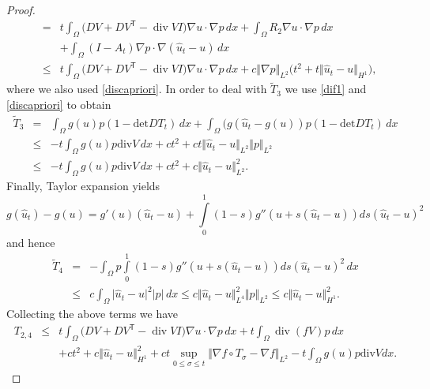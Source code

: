 \documentclass[10pt,a4paper]{amsart}
\DeclareMathOperator{\Div}{div}
\newcommand{\dx}{\,dx}
\begin{document}
\begin{proof}
\begin{eqnarray}
& = & 
t \int_{\Omega} \bigl( D V + D V^{\mathsf{T}} - \Div V I  \bigr) \nabla u \cdot \nabla p  \dx 
+ \int_{\Omega} R_2 \nabla u \cdot \nabla p  \dx \nonumber \\
& & + \int_{\Omega} (I - A_t) \nabla p \cdot \nabla ( \hat u_t - u)  \dx 
\nonumber\\
& \leq &  t \int_{\Omega} \bigl( D V + D V^{\mathsf{T}} - \Div V I  \bigr) \nabla u \cdot \nabla p  \dx + c \Vert \nabla p \Vert_{L^2} \bigl( t^2 +  t \Vert \hat u_t - u \Vert_{H^1} \bigr),  \label{eq:tildet2}
\end{eqnarray}
where we also used  \eqref{discapriori}. In order to deal with $\tilde T_3$ we use \eqref{dif1} and \eqref{discapriori} to obtain
\begin{eqnarray}
\tilde T_3 & =& \int_{\Omega} g(u) p (1 - \mbox{det} DT_t) \dx + \int_{\Omega} (g(\hat u_t - g(u)) p (1 - \mbox{det} D T_t) \dx \nonumber \\
& \leq & -t\int_{\Omega} g(u)p \mbox{div}V \dx + c t^2+ c t  \Vert \hat u_t - u \Vert_{L^2} \Vert p \Vert_{L^2} \nonumber \\
& \leq &  -t\int_{\Omega} g(u)p \mbox{div}V \dx + c t^2+ c \Vert \hat u_t - u \Vert_{L^2}^2. \label{eq:tilde3}
\end{eqnarray}
Finally, Taylor expansion yields
\[
g(\hat u_t)-g(u) = g'(u)(\hat u_t-u) + \int\limits_0^1 (1-s)g''(u+s(\hat u_t-u))ds (\hat u_t-u)^2
\]
and hence
\begin{eqnarray}
\tilde T_4 & = & 
- \int_{\Omega} p \int\limits_0^1 (1-s)g''(u+s(\hat u_t-u))ds (\hat u_t-u)^2 \dx \label{eq:tilde4} \\
& \leq & c 
 \int_{\Omega} \vert \hat u_t-u\vert^2  \vert p\vert \dx \le c 
 \Vert \hat u_t -u\Vert_{L^4}^2  \Vert p\Vert_{L^2} \leq  c \Vert \hat u_t-u\Vert_{H^1}^2. \nonumber
\end{eqnarray}
Collecting the above terms we have
\begin{eqnarray}
T_{2,4} & \leq &  t \int_{\Omega} \bigl( D V + D V^{\mathsf{T}} - \Div V I  \bigr) \nabla u \cdot \nabla p  \dx + 
t \int_{\Omega} \Div( f V) p  \dx  \nonumber \\
& & +  c t^2 +c \Vert \hat u_t - u \Vert_{H^1}^2 + c t  \sup_{0 \leq \sigma \leq t} \Vert \nabla f \circ T_\sigma - \nabla f \Vert_{L^2} -t\int_{\Omega} g(u)p \mbox{div}Vdx. \label{t24}
\end{eqnarray}


\end{proof}
\end{document}
